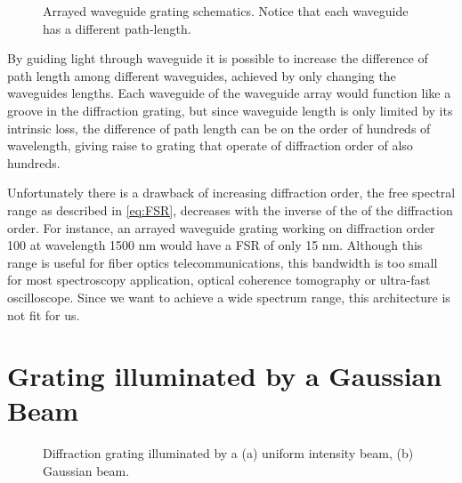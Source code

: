 \documentclass[12pt,twoside,english]{book}
\renewcommand{\~}{\perispomeni}%
\numberwithin{equation}{section}
\numberwithin{figure}{section}
\begin{document}
%
\begin{figure}[h]
\center{}
\caption{Arrayed waveguide grating schematics. Notice that each waveguide has a different path-length.\label{fig:awg}}

\end{figure}
By guiding light through waveguide it is possible to increase the difference of path length among different waveguides, achieved by only changing the waveguides lengths. Each waveguide of the waveguide array would function like a groove in the diffraction grating, but since waveguide length is only limited by its intrinsic loss, the difference of path length can be on the order of hundreds of wavelength, giving raise to grating that operate of diffraction order of also hundreds.

Unfortunately there is a drawback of increasing diffraction order, the free spectral range as described in \ref{eq:FSR}, decreases with the inverse of the of the diffraction order. For instance, an arrayed waveguide grating working on diffraction order 100 at wavelength 1500 nm would have a FSR of only 15 nm. Although this range is useful for fiber optics telecommunications, this bandwidth is too small for most spectroscopy application, optical coherence tomography or ultra-fast oscilloscope\cite{Foster:2008p71}. Since we want to achieve a wide spectrum range, this architecture is not fit for us.

\section{Grating illuminated by a Gaussian Beam}
\label{section:Grating gaussian beam}

%
\begin{figure}[h]
\centering
\caption{Diffraction grating illuminated by a (a) uniform intensity beam, (b) Gaussian beam.\label{fig:square-gaussian}} 
\end{figure}
\end{document}
